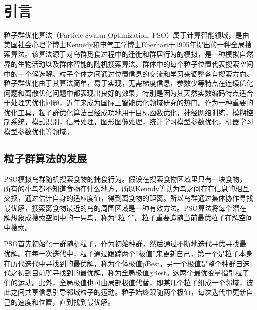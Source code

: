 

\section{引言}
粒子群优化算法（Particle Swarm Optimization, PSO）属于计算智能领域，是由美国社会心理学博士Kennedy和电气工学博士Eberhart于1995年提出的一种全局搜索算法。该算法源于对鸟群觅食过程中的迁徙和群居行为的模拟，是一种模拟自然界的生物活动以及群体智能的随机搜索算法。群体中的每个粒子位置代表搜索空间中的一个候选解。粒子个体之间通过位置信息的交流和学习来调整各自搜索方向。粒子群优化由于其算法简单，易于实现，无需梯度信息，参数少等特点在连续优化问题和离散优化问题中都表现出良好的效果，特别是因为其天然实数编码特点适合于处理实优化问题，近年来成为国际上智能优化领域研究的热门。作为一种重要的优化工具，粒子群优化算法已经成功地用于目标函数优化，神经网络训练，模糊控制系统，模式识别，信号处理，图形图像处理，统计学习模型参数优化，机器学习模型参数优化等领域。

\subsection{粒子群算法的发展}
PSO模拟鸟群随机搜索食物的捕食行为。假设在搜索食物区域里只有一块食物，所有的小鸟都不知道食物在什么地方，所以Kenndy等认为鸟之间存在信息的相互交换，通过估计自身的适应度值，得到离食物的距离。所以鸟群通过集体协作寻找最优解，搜索离食物最近的鸟的周围区域是一种有效方法。PSO算法将每个潜在解想象成搜索空间中的一只鸟，称为“粒子”。粒子重要追随当前最优粒子在解空间中搜索。

PSO首先初始化一群随机粒子，作为初始种群，然后通过不断地迭代寻优寻找最优解。在每一次迭代中，粒子通过跟踪两个“极值”来更新自己，第一个是粒子本身在历代迭代中寻找到的最优解，称为个体极值pBest，另一个极值是整个种群自迭代之初到目前所寻找到的最优解，称为全局极值gBest。这两个最优变量指引粒子们的运动。此外，全局极值也可由局部极值代替，即某几个粒子组成一个邻域，彼此之间共享信息引导邻域粒子的运动。粒子始终跟随两个极值，每次迭代中更新自己的速度和位置，直到找到最优解。

